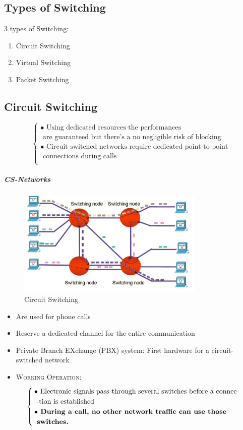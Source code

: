 \subsection{Types of Switching}
3 types of Switching:
\begin{enumerate}
\item Circuit Switching
\item Virtual Switching
\item Packet Switching 
\end{enumerate}

\subsection{Circuit Switching}
\begin{equation}
\begin{cases}
\bullet \text{ Using dedicated resources the performances} \\ \text{ are guaranteed but there's a no negligible risk of blocking}\\
\bullet \text{ Circuit-switched networks require dedicated point-to-point}\\ \text{ connections during calls}\\
\end{cases}
\end{equation}

\subparagraph{CS-Networks}
\begin{figure}
\centering
\includegraphics[width=0.8\textwidth]{CS.jpg}
\caption{\label{CS.jpg}Circuit Switching}
\end{figure}

\begin{itemize}
\item Are used for phone calls
\item Reserve a dedicated channel for the entire communication
\item Private Branch EXchange (PBX) system: First hardware for a circuit-switched network 
\item \textsc{Working Operation:} 
\begin{equation}
\begin{cases}
\bullet \text{ Electronic signals pass through several switches before a connec-}\\ \text{ -tion is established}\\
\bullet \text{\textbf{ During a call, no other network traffic can use those}} \\ \text{\textbf{ switches.}}
\end{cases}
\end{equation}
\end{itemize}

